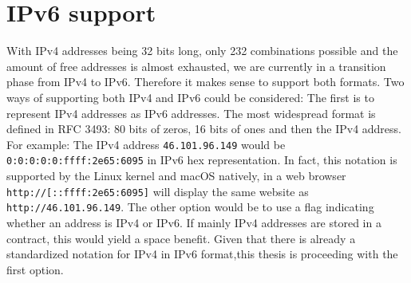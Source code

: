 \section{IPv6 support}

With IPv4 addresses being 32 bits long, only 232 combinations possible and the amount of free addresses is almost exhausted, we are currently in a transition phase from IPv4 to IPv6. Therefore it makes sense to support both formats. Two ways of supporting both IPv4 and IPv6 could be considered:
The first is to represent IPv4 addresses as IPv6 addresses. The most widespread format is defined in RFC 3493: 80 bits of zeros, 16 bits of ones and then the IPv4 address. For example: The IPv4 address \texttt{46.101.96.149} would be \texttt{0:0:0:0:0:ffff:2e65:6095} in IPv6 hex representation. In fact, this notation is supported by the Linux kernel and macOS natively, in a web browser \texttt{http://[::ffff:2e65:6095]} will display the same website as \texttt{http://46.101.96.149}.
The other option would be to use a flag indicating whether an address is IPv4 or IPv6. If mainly IPv4 addresses are stored in a contract, this would yield a space benefit.
Given that there is already a standardized notation for IPv4 in IPv6 format,this thesis is proceeding with the first option.

